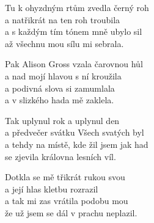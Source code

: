 \cho{}

\ve{}
Tu k ohyzdným rtům zvedla černý roh\\
a natřikrát na ten roh troubila\\
a s každým tím tónem mně ubylo sil\\
až všechnu mou sílu mi sebrala.

\ve{}
Pak Alison Gross vzala čarovnou hůl\\
a nad mojí hlavou s ní kroužila\\
a podivná slova si zamumlala\\
a v slizkého hada mě zaklela.

\cho{}

\ve{}
Tak uplynul rok a uplynul den\\
a předvečer svátku Všech svatých byl\\
a tehdy na místě, kde žil jsem jak had\\
se zjevila královna lesních víl.

\ve{}
Dotkla se mě třikrát rukou svou\\
a její hlas kletbu rozrazil\\
a tak mi zas vrátila podobu mou\\
že už jsem se dál v prachu neplazil.

\cho{}


\esong{}